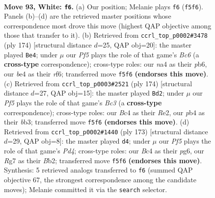 \documentclass[11pt]{article}
\begin{document}
\clearpage

\begin{figure}[p]\centering
\begin{subfigure}{0.46\textwidth}\centering
\resizebox{\linewidth}{!}{%
\newchessgame
\chessboard[
  setfen={8/2N3R1/8/5P2/npB1b1P1/6k1/8/5K2 w - - 8 93},
  showmover=false,
  pgfstyle=straightmove, color=movearrow, markmove={f5-f6}
]}
\caption{}
\end{subfigure}\hfill
\begin{subfigure}{0.46\textwidth}\centering
\resizebox{\linewidth}{!}{%
\newchessgame
\chessboard[
  setfen={5b2/8/1pB2r2/8/3k4/8/P3RPK1/8 w - - 9 88},
  showmover=false,
  pgfstyle=straightmove, color=movearrow, markmove={c6-e4}
]}
\caption{}
\end{subfigure}
\\[4pt]
\begin{subfigure}{0.46\textwidth}\centering
\resizebox{\linewidth}{!}{%
\newchessgame
\chessboard[
  setfen={8/5k2/p7/P1r5/4K3/1bB2P2/4R3/8 w - - 12 88},
  showmover=false,
  pgfstyle=straightmove, color=movearrow, markmove={c3-d2}
]}
\caption{}
\end{subfigure}\hfill
\begin{subfigure}{0.46\textwidth}\centering
\resizebox{\linewidth}{!}{%
\newchessgame
\chessboard[
  setfen={8/6p1/6P1/3p4/4k3/8/Bb1K4/8 b - - 79 87},
  showmover=false,
  pgfstyle=straightmove, color=movearrow, markmove={d5-d4}
]}
\caption{}
\end{subfigure}
\caption{\textbf{Move 93, White: \texttt{f6}.} (a) Our position; Melanie plays \texttt{f6} (\texttt{f5f6}). Panels (b)--(d) are the retrieved master positions whose correspondence most drove this move (highest QAP objective among those that transfer to it). (b) Retrieved from \texttt{ccrl\_top\_p0002\#3478} (ply 174) [structural distance $d$=25, QAP obj=20]: the master played \texttt{Be4}; under $\mu$ our \emph{Pf5} plays the role of that game's \emph{Bc6} (a \textbf{cross-type} correspondence); cross-type roles: our \emph{n}a4 as their \emph{p}b6, our \emph{b}e4 as their \emph{r}f6; transferred move \texttt{f5f6} \textbf{(endorses this move)}. (c) Retrieved from \texttt{ccrl\_top\_p0003\#2521} (ply 174) [structural distance $d$=27, QAP obj=15]: the master played \texttt{Bd2}; under $\mu$ our \emph{Pf5} plays the role of that game's \emph{Bc3} (a \textbf{cross-type} correspondence); cross-type roles: our \emph{B}c4 as their \emph{R}e2, our \emph{p}b4 as their \emph{b}b3; transferred move \texttt{f5f6} \textbf{(endorses this move)}. (d) Retrieved from \texttt{ccrl\_top\_p0002\#1440} (ply 173) [structural distance $d$=29, QAP obj=8]: the master played \texttt{d4}; under $\mu$ our \emph{Pf5} plays the role of that game's \emph{Pd4}; cross-type roles: our \emph{B}c4 as their \emph{p}g6, our \emph{R}g7 as their \emph{B}b2; transferred move \texttt{f5f6} \textbf{(endorses this move)}. Synthesis: 5 retrieved analogs transferred to \texttt{f6} (summed QAP objective 67, the strongest correspondence among the candidate moves); Melanie committed it via the \texttt{search} selector.}
\label{fig:thought-m184}
\end{figure}
\end{document}
